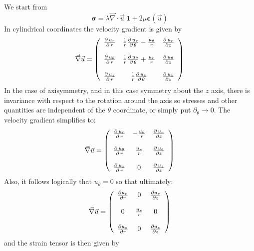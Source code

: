 We start from 
\begin{equation}
{\bm \sigma} = \lambda \vec\nabla\cdot\vec{u}\;  {\bm 1}
+2 \mu {\bm \varepsilon}(\vec{u})
\label{eq:elast_ass}
\end{equation}
In cylindrical coordinates the velocity gradient is given by 
\[
\vec\nabla \vec{u}  =
\left(
\begin{array}{ccc}
{\partial \, u_r \over \partial \, r} &
{1 \over r} {\partial \, u_r \over \partial \, \theta} - {u_{\theta} \over r} &
{\partial \, u_r \over \partial z} \\
\\
{\partial \, u_{\theta} \over \partial \, r} &
{1 \over r} {\partial \, u_{\theta} \over \partial \, \theta} + {u_r \over r} &
{\partial \, u_{\theta} \over \partial z} \\
\\
{\partial \, u_{z} \over \partial \, r} &
{1 \over r} {\partial \, u_{z} \over \partial \, \theta} &
{\partial \, u_{z} \over \partial z}
\end{array}
\right)
\]
In the case of axisymmetry, and in this case symmetry about the $z$ axis, there is invariance with respect to the rotation around the axis so stresses and other quantities are independent of the $\theta$ coordinate, or simply put $\partial_\theta \rightarrow 0$.
The velocity gradient simplifies to:
\[
\vec\nabla \vec{u}  =
\left(
\begin{array}{ccc}
{\partial \, u_r \over \partial \, r} &
- {u_{\theta} \over r} &
{\partial \, u_r \over \partial z} \\
\\
{\partial \, u_{\theta} \over \partial \, r} &
{u_r \over r} &
{\partial \, u_{\theta} \over \partial z} \\
\\
{\partial \, u_{z} \over \partial \, r} &
0 &
{\partial \, u_{z} \over \partial z}
\end{array}
\right)
\]
Also, it follows logically that $u_\theta=0$ so that ultimately:
\[
\vec\nabla \vec{u}  =
\left(
\begin{array}{ccc}
\frac{\partial u_r}{\partial r} & 0 & {\partial  u_r \over \partial z} \\\\
0 & {u_r \over r} & 0 \\ \\
{\partial u_{z} \over \partial  r} & 0 & {\partial  u_{z} \over \partial z}
\end{array}
\right)
\]
and the strain tensor is then given by 
